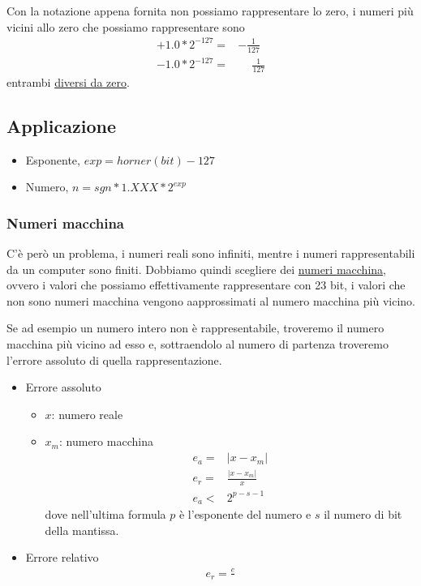 \documentclass[../main.tex]{subfiles}
\begin{document}
\vspace{0.5cm}
Con la notazione appena fornita non possiamo rappresentare lo zero, i numeri più vicini allo zero che possiamo rappresentare sono
\begin{align*}
    + 1.0 * 2^{-127} =& -\frac{1}{127}\\
    - 1.0 * 2^{-127} =& \phantom{-}\frac{1}{127} 
\end{align*}
entrambi \underline{diversi da zero}.

\vspace{0.5cm}
\subsection{Applicazione}
\begin{itemize}
    \item Esponente, $exp = horner(bit) -127$
    \item Numero, $n = sgn * 1.XXX * 2^{exp}$
\end{itemize}

\subsubsection{Numeri macchina}
C'è però un problema, i numeri reali sono infiniti, mentre i numeri rappresentabili da un computer sono finiti. Dobbiamo quindi scegliere
dei \underline{numeri macchina}, ovvero i valori che possiamo effettivamente rappresentare con 23 bit, i valori che non sono numeri macchina vengono 
aapprossimati al numero macchina più vicino. 

Se ad esempio un numero intero non è rappresentabile, troveremo il numero macchina più vicino ad esso e, sottraendolo al numero di partenza
troveremo l'errore assoluto di quella rappresentazione.
\begin{itemize}
    \item Errore assoluto
    \begin{itemize}
        \item $x$: numero reale
        \item $x_m$: numero macchina \begin{align*}
            e_a =& \left\lvert x - x_m\right\rvert  \\
            e_r =& \frac{\left\lvert x - x_m\right\rvert}{x} \\
            e_a <& 2^{p-s-1}
        \end{align*}
        dove nell'ultima formula $p$ è l'esponente del numero e $s$ il numero di bit della mantissa.
    \end{itemize}
    \item Errore relativo \begin{align*}
        e_r = \frac{e}{}
    \end{align*}
\end{itemize}
\end{document}
